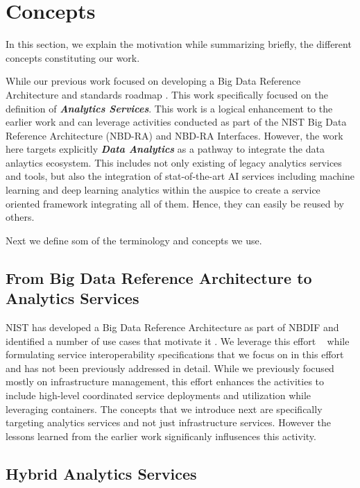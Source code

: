 

\section{Concepts}\label{s:background}

In this section, we explain the motivation while summarizing briefly,
the different concepts constituting our work.

While our previous work focused on developing a Big Data Reference
Architecture and  standards roadmap \cite{nist-v8}. This work
specifically focused on the definition of {\bf\em Analytics Services}.
This work is a logical enhancement to the earlier work and can
leverage activities conducted as part of the NIST Big Data Reference
Architecture (NBD-RA) and NBD-RA Interfaces.  However, the work here
targets explicitly {\bf\em Data Analytics} as a pathway to integrate
the data anlaytics ecosystem. This includes not only existing of
legacy analytics services and tools, but also the integration of
stat-of-the-art AI services including machine learning and deep
learning analytics within the auspice to create a service oriented
framework integrating all of them. Hence, they can easily be reused by
others.

Next we define som of the terminology and concepts we use.


\subsection{From Big Data Reference Architecture to Analytics Services}
\label{s:arch}

NIST has developed a Big Data Reference Architecture as part of
NBDIF\cite{nist-v6} and identified a number of use cases that motivate
it \cite{nist-v3}. We leverage this effort
~\cite{nist-v1,nist-v2,nist-v3,nist-v4,nist-v5,nist-v6,nist-v7,nist-v8,nist-v9}
while formulating service interoperability specifications that we
focus on in this effort and has not been previously addressed in
detail. While we previously focused mostly on infrastructure
management, this effort enhances the activities to include high-level
coordinated service deployments and utilization while leveraging
containers. The concepts that we introduce next are specifically
targeting analytics services and not just infrastructure services.
However the lessons learned from the earlier work significanly
influsences this activity.


\subsection{Hybrid Analytics Services}

